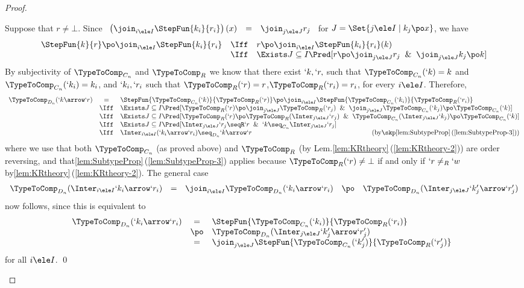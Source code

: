 \documentclass{lmcs}
\begin{document}
\begin{proof}
\begin{description}
Suppose that $r \neq \bot$. 
Since
%
 $ \begin{array}{rcl}
 \left(\join_{i \ele I} \StepFun{k_i }{ r_i}\right)(x) &=& \join_{j \ele J}r_j 
 \end{array} $
for $J = \Set{j \ele I \mid k_j\po x}$, we have 
%
 \[ \begin{array}{lll}
 \StepFun{k }{ r} \po \join_{i \ele I} \StepFun{k_i }{ r_i} & \Iff &
r \po \join_{i \ele I} \StepFun{k_i }{ r_i}(k) \\ %
& \Iff & \Exists J \subseteq I \Pred[ r \po \join_{j \ele J}r_j \And \join_{j \ele J}k_j \po k ]
 \end{array} \]
By subjectivity of $\TypeToComp_{C_n}$ and $\TypeToComp_R$ we know that
there exist $`k,`r,$ such that $\TypeToComp_{C_n}(`k) = k$ and $\TypeToComp_{C_n}(`k_i) = k_i$,
and $`k_i,`r_i$ such that $\TypeToComp_R(`r) = r$,$\TypeToComp_{R}(`r_i) = r_i$, for every $i\ele I$. Therefore,
%
 \[ \begin{array}{lcll}
 \TypeToComp_{D_n}(`k\arrow `r) 
	& = & 
 \StepFun{\TypeToComp_{C_n}(`k) }{ \TypeToComp_R(`r)} \po 
 \join_{i \ele I} \StepFun{\TypeToComp_{C_n}(`k_i) }{ \TypeToComp_R(`r_i)} 
	\\ & \Iff & 
 \Exists J \subseteq I \Pred[ \TypeToComp_R(`r) \po \join_{j \ele J}\TypeToComp_R(`r_j) \And 
 \join_{j \ele J}\TypeToComp_{C_n}(`k_j) \po \TypeToComp_{C_n}(`k) ]
	\\ & \Iff & 
 \Exists J \subseteq I \Pred[ \TypeToComp_R(`r) \po \TypeToComp_R(\Inter_{j \ele J}`r_j) \And 
 \TypeToComp_{C_n}(\Inter_{j \ele J}`k_j) \po \TypeToComp_{C_n}(`k) ]
	\\ & \Iff & 
 \Exists J \subseteq I \Pred[ \Inter_{j \ele J}`r_j \seqR `r \And `k \seq_{C_n} \Inter_{j \ele J}`r_j ]
	\\ & \Iff & 
 \Inter_{i \ele I} (`k_i\arrow `r_i) \seq_{D_n} `k\arrow `r 
	\hfill \textrm{(by\skp\ref{lem:SubtypeProp}\,(\ref{lem:SubtypeProp-3}))}
 \end{array} \]
where we use that both $\TypeToComp_{C_n}$ (as proved above) and $\TypeToComp_R$ (by Lem.\skp\ref{lem:KRtheory}\,(\ref{lem:KRtheory-2})) are order reversing, and that\skp\ref{lem:SubtypeProp}\,(\ref{lem:SubtypeProp-3}) applies because $\TypeToComp_R(`r) \neq \bot$ if and only if $`r \neq_R `w$ by\skp\ref{lem:KRtheory}\,(\ref{lem:KRtheory-2}).
%
The general case 
%
 \[ \begin{array}{rcl@{\quad}lc}
 \TypeToComp_{D_n}(\Inter_{i \ele I}`k_i\arrow `r_i) 
	&=& 
 \join_{i \ele I}\TypeToComp_{D_n}(`k_i\arrow `r_i)
	&\po& 
 \TypeToComp_{D_n}(\Inter_{j \ele J}`k'_j\arrow `r'_j) 
 \end{array} \] 
now follows, since this is equivalent to
%
 \[ \begin{array}{rcl@{\quad}lccc}
 \TypeToComp_{D_n}(`k_i\arrow `r_i) 
	&=& 
 \StepFun{\TypeToComp_{C_n}(`k_i) }{ \TypeToComp_R(`r_i)} \\
	&\po& 
 \TypeToComp_{D_n}(\Inter_{j \ele J}`k'_j\arrow `r'_j) \\
	&=& 
\join_{j \ele J} \StepFun{\TypeToComp_{C_n}(`k'_j) }{ \TypeToComp_R(`r'_j)}
 \end{array} \]
for all $i \ele I$.%
\qed


\end{description}
\end{proof}
\end{document}
